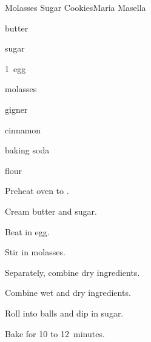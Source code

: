 \begin{recipe}{Molasses Sugar Cookies}{Maria Masella}{}

\begin{ingredients}
\item \C{\threequarter} butter
\item {} sugar
\item 1~egg
\item {} molasses
\item {} gigner
\item {} cinnamon
\item {} baking soda
\item {} flour
\end{ingredients}

\begin{directions}
\item Preheat oven to .
\item Cream butter and sugar.
\item Beat in egg.
\item Stir in molasses.
\item Separately, combine dry ingredients.
\item Combine wet and dry ingredients.
\item Roll into balls and dip in sugar.
\item Bake for 10 to 12~minutes.
\end{directions}

\end{recipe}
